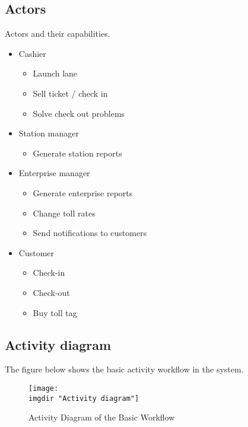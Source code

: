 \subsection{Actors}
Actors and their capabilities.
\begin{itemize}
\item Cashier

\begin{itemize}
  \item Launch lane
  \item Sell ticket / check in 
  \item Solve check out problems
\end{itemize}
\end{itemize}

\begin{itemize}
\item Station manager

\begin{itemize}
  \item Generate station reports
\end{itemize}
\end{itemize}

\begin{itemize}
\item Enterprise manager

\begin{itemize}
  \item Generate enterprise reports
  \item Change toll rates
  \item Send notifications to customers
\end{itemize}
\end{itemize}

\begin{itemize}
\item Customer

\begin{itemize}
  \item Check-in
  \item Check-out
  \item Buy toll tag
\end{itemize}
\end{itemize}

\subsection{Activity diagram}
The figure below shows the basic activity workflow in the system.
\begin{figure}[H]
\texttt{[image: \\imgdir "Activity diagram"]}
\centering
\caption{Activity Diagram of the Basic Workflow}
\label{fig:activity_diagram}
\end{figure}

